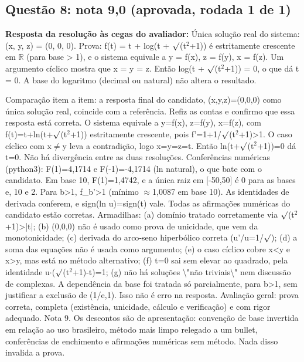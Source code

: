 \documentclass{article}%
\begin{document}
\subsection*{Questão 8: nota 9,0 (aprovada, rodada 1 de 1)}%
\textbf{Resposta da resolução às cegas do avaliador:} Única solução real do sistema: (x, y, z) = (0, 0, 0).\newline%
\newline%
Prova: f(t) = t + log(t + $\surd$(t$^2$+1)) é estritamente crescente em $\mathbb{R}$ (para base > 1), e o sistema equivale a y = f(x), z = f(y), x = f(z). Um argumento cíclico mostra que x = y = z. Então log(t + $\surd$(t$^2$+1)) = 0, o que dá t = 0. A base do logaritmo (decimal ou natural) não altera o resultado.\par %
Comparação item a item: a resposta final do candidato, (x,y,z)=(0,0,0) como única solução real, coincide com a referência. Refiz as contas e confirmo que essa resposta está correta. O sistema equivale a y=f(x), z=f(y), x=f(z), com f(t)=t+ln(t+$\surd$(t$^2$+1)) estritamente crescente, pois f'=1+1/$\surd$(t$^2$+1)>1. O caso cíclico com x$\neq$y leva a contradição, logo x=y=z=t. Então ln(t+$\surd$(t$^2$+1))=0 dá t=0. Não há divergência entre as duas resoluções.\newline%
\newline%
Conferências numéricas (python3): F(1)=4,1714 e F(-1)=-4,1714 (ln natural), o que bate com o candidato. Em base 10, F(1)=1,4742, e a única raiz em {[}-50,50{]} é 0 para as bases e, 10 e 2. Para b>1, f\_b'>1 (mínimo $\approx$1,0087 em base 10). As identidades de derivada conferem, e sign(ln u)=sign(t) vale. Todas as afirmações numéricas do candidato estão corretas.\newline%
\newline%
Armadilhas: (a) domínio tratado corretamente via $\surd$(t$^2$+1)>|t|; (b) (0,0,0) não é usado como prova de unicidade, que vem da monotonicidade; (c) derivada do arco{-}seno hiperbólico correta (u'/u=1/$\surd$); (d) a soma das equações não é usada como argumento; (e) o caso cíclico cobre x<y e x>y, mas está no método alternativo; (f) t=0 sai sem elevar ao quadrado, pela identidade u$\cdot$($\surd$(t$^2$+1)-t)=1; (g) não há soluções \textbackslash{}"não triviais\textbackslash{}" nem discussão de complexas. A dependência da base foi tratada só parcialmente, para b>1, sem justificar a exclusão de (1/e,1). Isso não é erro na resposta.\newline%
\newline%
Avaliação geral: prova correta, completa (existência, unicidade, cálculo e verificação) e com rigor adequado. Nota 9. Os descontos são de apresentação: convenção de base invertida em relação ao uso brasileiro, método mais limpo relegado a um bullet, conferências de enchimento e afirmações numéricas sem método. Nada disso invalida a prova.%
\end{document}
